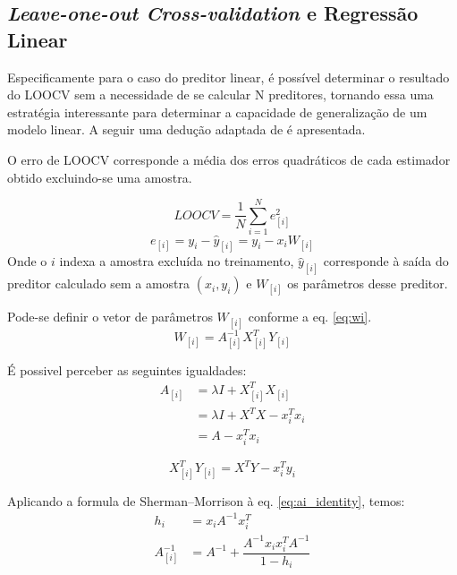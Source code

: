 \subsection{ \textit{Leave-one-out Cross-validation} e Regressão Linear}

Especificamente para o caso do preditor linear, é possível determinar o resultado do LOOCV sem a necessidade de se 
calcular N preditores, tornando essa uma estratégia interessante para determinar a capacidade de generalização de 
um modelo linear. A seguir uma dedução adaptada de \cite[p. 268]{lin_reg_analysis} é apresentada.

O erro de LOOCV corresponde a média dos erros quadráticos de cada estimador obtido excluindo-se uma amostra. 

\begin{equation}
    LOOCV = \dfrac{1}{N} \sum_{i=1}^{N}e^2_{[i]}
    \label{eq:cv_error}
\end{equation}
\begin{equation}
    e_{[i]} = y_i - \hat{y}_{[i]} = y_i - x_iW_{[i]} 
    \label{eq:ith_error}
\end{equation}
Onde o $i$ indexa a amostra excluída no treinamento, $\hat{y}_{[i]}$ corresponde à saída do preditor calculado sem a
amostra $(x_i,y_i)$ e $W_{[i]}$ os parâmetros desse preditor.

Pode-se definir o vetor de parâmetros $W_{[i]}$ conforme a eq. \ref{eq:wi}.
\begin{equation}
    W_{[i]} = A_{[i]}^{-1}X_{[i]}^TY_{[i]}
    \label{eq:wi}
\end{equation} 

É possivel perceber as seguintes igualdades:
\smallskip\noindent
\begin{equation}
    \begin{split}
        A_{[i]} &= \lambda I + X_{[i]}^TX_{[i]} \\
                &= \lambda I + X^TX - x_i^Tx_i \\
                &= A - x_i^Tx_i    
    \end{split}
    \label{eq:ai_identity}
\end{equation} 

\begin{equation}
    X_{[i]}^TY_{[i]} = X^TY - x_i^Ty_i
    \label{eq:X_iY_i_identity}
\end{equation} 

Aplicando a formula de Sherman–Morrison à eq. \ref{eq:ai_identity}, temos:
\smallskip\noindent
\begin{equation}
    \begin{split}        
       h_i &= x_iA^{-1}x_i^T \\
       A_{[i]}^{-1} &= A^{-1} + \dfrac{A^{-1}x_ix_i^TA^{-1}}{1-h_i}
    \end{split}
    \label{eq:sherman}
\end{equation}

